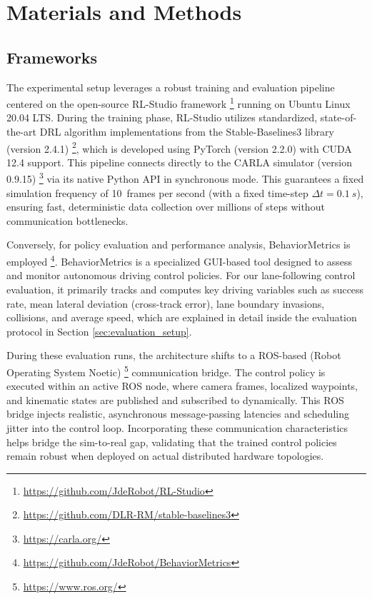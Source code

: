 \documentclass[sn-mathphys,Numbered]{sn-jnl}
\begin{document}
\section{Materials and Methods}
\label{sec:materialsmethods}

\subsection{Frameworks}

The experimental setup leverages a robust training and evaluation pipeline centered on the open-source RL-Studio framework \citep{cabo2022rlstudio}\footnote{\url{https://github.com/JdeRobot/RL-Studio}} running on Ubuntu Linux 20.04 LTS. During the training phase, RL-Studio utilizes standardized, state-of-the-art DRL algorithm implementations from the Stable-Baselines3 library (version 2.4.1) \citep{raffin2021stablebaselines3}\footnote{\url{https://github.com/DLR-RM/stable-baselines3}}, which is developed using PyTorch (version 2.2.0) with CUDA 12.4 support. This pipeline connects directly to the CARLA simulator (version 0.9.15) \citep{dosovitskiy2017carla}\footnote{\url{https://carla.org/}} via its native Python API in synchronous mode. This guarantees a fixed simulation frequency of 10~frames per second (with a fixed time-step $\Delta t = \SI{0.1}{s}$), ensuring fast, deterministic data collection over millions of steps without communication bottlenecks.

Conversely, for policy evaluation and performance analysis, BehaviorMetrics is employed \citep{paniego2024behaviormetrics}\footnote{\url{https://github.com/JdeRobot/BehaviorMetrics}}. BehaviorMetrics is a specialized GUI-based tool designed to assess and monitor autonomous driving control policies. For our lane-following control evaluation, it primarily tracks and computes key driving variables such as success rate, mean lateral deviation (cross-track error), lane boundary invasions, collisions, and average speed, which are explained in detail inside the evaluation protocol in Section \ref{sec:evaluation_setup}.

During these evaluation runs, the architecture shifts to a ROS-based (Robot Operating System Noetic) \citep{quigley2009ros}\footnote{\url{https://www.ros.org/}} communication bridge. The control policy is executed within an active ROS node, where camera frames, localized waypoints, and kinematic states are published and subscribed to dynamically. This ROS bridge injects realistic, asynchronous message-passing latencies and scheduling jitter into the control loop. Incorporating these communication characteristics helps bridge the sim-to-real gap, validating that the trained control policies remain robust when deployed on actual distributed hardware topologies.
\end{document}
